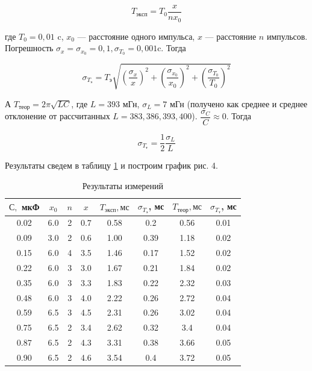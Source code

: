 \documentclass[12pt]{kiarticle} %
\begin{document}
\begin{equation}\label{}
T_{эксп} = T_0 \dfrac{x}{nx_0}
\end{equation}

где $ T_0 = 0,01 $ c, $ x_0 $ --- расстояние одного импульса, $ x $ --- расстояние $ n $ импульсов. Погрешность $ \sigma_x = \sigma_{x_0} = 0,1, \sigma_{T_0} = 0,001  $c. Тогда 

\begin{equation}\label{}
\sigma_{T_э} = T_э \sqrt{ \left( \dfrac{ \sigma_x}{x} \right)^2 + \left( \dfrac{ \sigma_{x_0}}{x_0} \right)^2  +  \left( \dfrac{ \sigma_{T_0}}{T_0} \right)^2}
\end{equation}

А $ T_{теор} = 2\pi\sqrt{LC} $, где $ L = 393 $ мГн, $ \sigma_L = 7 $ мГн (получено как среднее и среднее отклонение от рассчитанных $ L = 383, 386, 393, 400 $). $ \dfrac{\sigma_C}{C} \approx 0 $. Тогда 

\begin{equation}\label{}
\sigma_{T_т} = \dfrac{1}{2} \dfrac{\sigma_L}{L}
\end{equation}

Результаты сведем в таблицу \ref{resT} и построим график рис. 4. 

\begin{table}[h!]
	\centering
	\caption{Результаты измерений}
	\begin{tabular}{|c|c|c|c|c|c|c|c|}
		\hline
		$ С,$ мкФ & $ x_0 $ & $ n $ & $ x $ & $ T_{эксп}, мс $& $ \sigma_{T_э} $, мс & $ T_{теор}, мс $ & $ \sigma_{T_т} $, мс \\
		\hline
		0.02 & 6.0 & 2 & 0.7 & 0.58 & 0.2 & 0.56 & 0.01 \\
		0.09 & 3.0 & 2 & 0.6 & 1.00 & 0.39 & 1.18 & 0.02 \\
		0.15 & 6.0 & 4 & 3.5 & 1.46 & 0.17 & 1.52 & 0.02 \\
		0.22 & 6.0 & 3 & 3.0 & 1.67 & 0.21 & 1.84 & 0.02 \\
		0.35 & 6.0 & 3 & 3.3 & 1.83 & 0.22 & 2.32 & 0.03 \\
		0.48 & 6.0 & 3 & 4.0 & 2.22 & 0.26 & 2.72 & 0.04 \\
		0.59 & 6.5 & 3 & 4.5 & 2.31 & 0.26 & 3.02 & 0.04 \\
		0.75 & 6.5 & 2 & 3.4 & 2.62 & 0.32 & 3.4 & 0.04 \\
		0.87 & 6.5 & 2 & 4.3 & 3.31 & 0.38 & 3.66 & 0.05 \\
		0.90 & 6.5 & 2 & 4.6 & 3.54 & 0.4 & 3.72 & 0.05 \\
		\hline
	\end{tabular}%
\label{resT}%
\end{table}%
\end{document}
